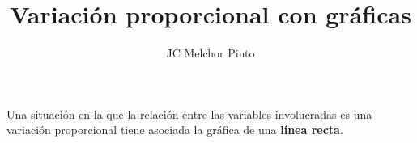 \documentclass[12pt,addpoints,answers]{guia}
\title{Variación proporcional con gráficas}
\author{JC Melchor Pinto}
\begin{document}
\pagestyle{headandfoot}

\INFO
\printanswers
\vspace{-0.5cm}


\begin{questions}
    \questionboxed[10] 
    \questionboxed[10] 

    \begin{importantbox}
        Una situación en la que la relación entre las variables involucradas es una variación
        proporcional tiene asociada la gráfica de una \textbf{línea recta}.
    \end{importantbox}

    \questionboxed[10] 
    \newpage
    \questionboxed[10] 
    \newpage
    \questionboxed[10] 
    \questionboxed[10] 
\end{questions}
\end{document}
